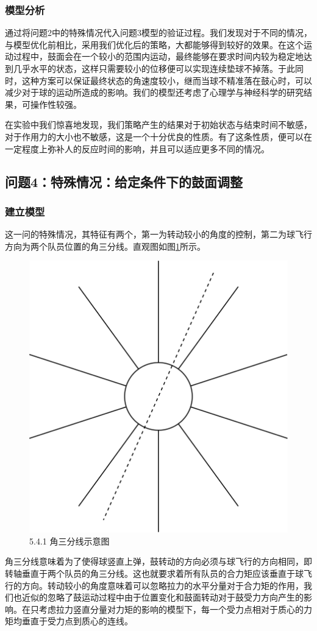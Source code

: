 \documentclass[nocover]{cumcmart}%
\begin{document}
\subsubsection{模型分析}

通过将问题2中的特殊情况代入问题3模型的验证过程。我们发现对于不同的情况，与模型优化前相比，采用我们优化后的策略，大都能够得到较好的效果。在这个运动过程中，鼓面会在一个较小的范围内运动，最终能够在要求时间内较为稳定地达到几乎水平的状态，这样只需要较小的位移便可以实现连续垫球不掉落。于此同时，这种方案可以保证最终状态的角速度较小，继而当球不精准落在鼓心时，可以减少对于球的运动所造成的影响。我们的模型还考虑了心理学与神经科学的研究结果，可操作性较强。

在实验中我们惊喜地发现，我们策略产生的结果对于初始状态与结束时间不敏感，对于作用力的大小也不敏感，这是一个十分优良的性质。有了这条性质，便可以在一定程度上弥补人的反应时间的影响，并且可以适应更多不同的情况。

\subsection{问题4：特殊情况：给定条件下的鼓面调整}
\subsubsection{建立模型}
这一问的特殊情况，其特征有两个，第一为转动较小的角度的控制，第二为球飞行方向为两个队员位置的角三分线。直观图如图\ref{5.4.1 角三分线示意图}所示。
\begin{figure}[h!]
    \centering
    \includegraphics[width=0.4\linewidth]{figures/4.png}
    \caption{5.4.1 角三分线示意图}
    \label{5.4.1 角三分线示意图}
\end{figure}

角三分线意味着为了使得球竖直上弹，鼓转动的方向必须与球飞行的方向相同，即转轴垂直于两个队员的角三分线。这也就要求着所有队员的合力矩应该垂直于球飞行的方向。转动较小的角度意味着可以忽略拉力的水平分量对于合力矩的作用，我们也近似的忽略了鼓运动过程中由于位置变化和鼓面转动对于鼓受力方向产生的影响。在只考虑拉力竖直分量对力矩的影响的模型下，每一个受力点相对于质心的力矩均垂直于受力点到质心的连线。
\end{document}
